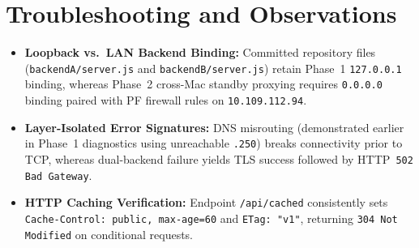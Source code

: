\documentclass[conference]{IEEEtran}
\begin{document}
\section{Troubleshooting and Observations}
\begin{itemize}
    \item \textbf{Loopback vs.\ LAN Backend Binding:} Committed repository files (\texttt{backendA/server.js} and \texttt{backendB/server.js}) retain Phase~1 \texttt{127.0.0.1} binding, whereas Phase~2 cross-Mac standby proxying requires \texttt{0.0.0.0} binding paired with PF firewall rules on \texttt{10.109.112.94}.
    \item \textbf{Layer-Isolated Error Signatures:} DNS misrouting (demonstrated earlier in Phase~1 diagnostics using unreachable \texttt{.250}) breaks connectivity prior to TCP, whereas dual-backend failure yields TLS success followed by HTTP~\texttt{502 Bad Gateway}.
    \item \textbf{HTTP Caching Verification:} Endpoint \texttt{/api/cached} consistently sets \texttt{Cache-Control: public, max-age=60} and \texttt{ETag: "v1"}, returning \texttt{304 Not Modified} on conditional requests.
\end{itemize}
\end{document}
